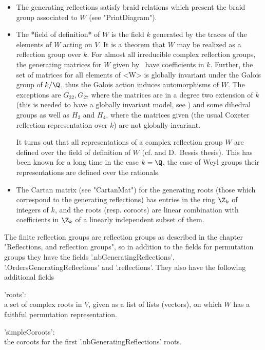 \begin{itemize}
\item  The generating reflections satisfy braid relations which present the
braid group associated to $W$ (see "PrintDiagram").
\item
The  *field of definition* of $W$ is  the field $k$ generated by the traces
of  the elements  of $W$  acting on  $V$. It  is a  theorem that $W$ may be
realized as a reflection group over $k$. For almost all irreducible complex
reflection  groups, the generating matrices for  $W$ given by \CHEVIE\ have
coefficients  in $k$. Further, the set of  matrices for all elements of <W>
is  globally invariant  under the  Galois group  of $k/\Q$, thus the Galois
action  induces automorphisms of  $W$. The exceptions  are $G_{22}, G_{27}$
where  the matrices are in a degree two extension of $k$ (this is needed to
have  a  globally  invariant  model,  see  \cite{MarinMichel10})  and  some
dihedral  groups as well as $H_3$ and  $H_4$, where the matrices given (the
usual   Coxeter  reflection  representation  over  $k$)  are  not  globally
invariant. 

It turns out that all representations of a complex reflection group $W$ are
defined over the field of definition of $W$ (cf. \cite{Ben76} and D.~Bessis
thesis).  This has been known for a long  time in the case $k=\Q$, the case
of Weyl groups\: their representations are defined over the rationals.
\item  The Cartan matrix (see "CartanMat")  for the generating roots (those
which  correspond to  the generating  reflections) has  entries in the ring
$\Z_k$  of  integers  of  $k$,  and  the  roots  (resp. coroots) are linear
combination with coefficients in $\Z_k$ of a linearly independent subset of
them.
\end{itemize}

The  finite reflection  groups are  reflection groups  as described  in the
chapter  "Reflections, and reflection groups", so in addition to the fields
for  permutation  groups  they  have the fields '.nbGeneratingReflections',
'.OrdersGeneratingReflections'  and  '.reflections'.  They  also  have  the
following additional fields\:

'roots':\\  a  set  of  complex  roots  in  $V$,  given  as a list of lists
       (vectors), on which $W$ has a faithful permutation representation.

'simpleCoroots':\\ the  coroots for the  first '.nbGeneratingReflections'
       roots.

